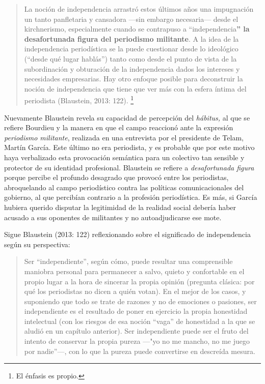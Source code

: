 \begin{quote}
La noción de independencia arrastró estos últimos años una impugnación un tanto panfletaria y cansadora ---sin embargo necesaria--- desde el kirchnerismo, especialmente cuando se contrapuso a ``independencia\textbf{'' la desafortunada figura del periodismo militante}. A la idea de la independencia periodística se la puede cuestionar desde lo ideológico (``desde qué lugar hablás'') tanto como desde el punto de vista de la subordinación y obturación de la independencia dados los intereses y necesidades empresarias. Hay otro enfoque posible para deconstruir la noción de independencia que tiene que ver más con la esfera íntima del periodista (Blaustein, 2013: 122). \footnote{El énfasis es propio.}
\end{quote}

Nuevamente Blaustein revela su capacidad de percepción del \emph{hábitus,} al que se refiere Bourdieu y la manera en que el campo reaccionó ante la expresión \emph{periodismo militante}, realizada en una entrevista por el presidente de Telam, Martín García. Este último no era periodista, y es probable que por este motivo haya verbalizado esta provocación semántica para un colectivo tan sensible y protector de su identidad profesional. Blaustein se refiere a \emph{desafortunada figura} porque percibe el profundo desagrado que provocó entre los periodistas, abroquelando al campo periodístico contra las políticas comunicacionales del gobierno, al que percibían contrario a la profesión periodística. Es más, si García hubiera querido disputar la legitimidad de la realidad social debería haber acusado a sus oponentes de militantes y no autoadjudicarse ese mote.

Sigue Blaustein (2013: 122) reflexionando sobre el significado de independencia según su perspectiva:

\begin{quote}
Ser ``independiente'', según cómo, puede resultar una comprensible maniobra personal para permanecer a salvo, quieto y confortable en el propio lugar a la hora de sincerar la propia opinión (pregunta clásica: por qué los periodistas no dicen a quién votan). En el mejor de los casos, y suponiendo que todo se trate de razones y no de emociones o pasiones, ser independiente es el resultado de poner en ejercicio la propia honestidad intelectual (con los riesgos de esa noción ``vaga'' de honestidad a la que se aludió en un capítulo anterior). Ser independiente puede ser el fruto del intento de conservar la propia pureza ---"yo no me mancho, no me juego por nadie''---, con lo que la pureza puede convertirse en descreída mesura.
\end{quote}

